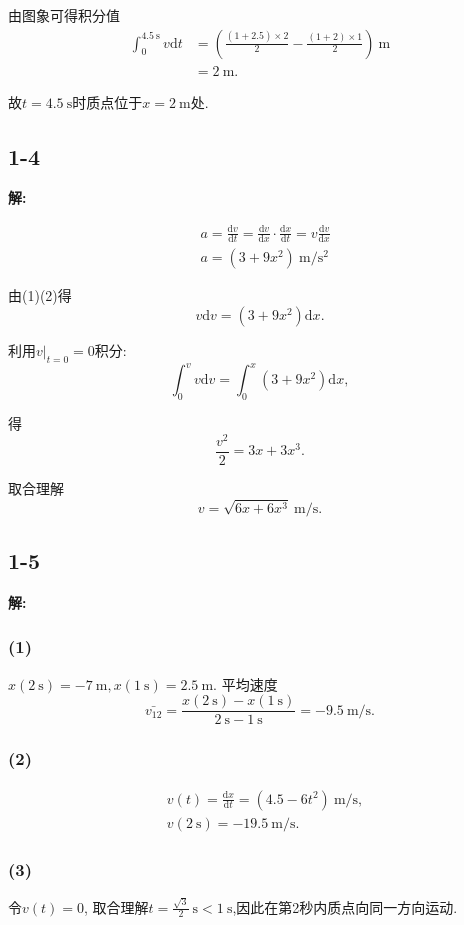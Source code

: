\documentclass[twocolumn]{ctexart}
\begin{document}
由图象可得积分值 
\begin{align*} 
\int_{0}^{4.5\ \mathrm{s}}v\mathrm{d}t&=(\frac{(1+2.5)\times 2}{2}-\frac{(1+2)\times 1}{2})\ \mathrm{m}\\ 
&=2\ \mathrm{m}. 
\end{align*} 

故$t=4.5\ \mathrm{s}$时质点位于$x=2\ \mathrm{m}$处. 

\subsection*{1-4} 
\noindent 
\textbf{解:} 

\begin{align} 
&a=\frac{\mathrm{d}v}{\mathrm{d}t}=\frac{\mathrm{d}v}{\mathrm{d}x}\cdot\frac{\mathrm{d}x}{\mathrm{d}t}=v\frac{\mathrm{d}v}{\mathrm{d}x}\\ 
&a=(3+9x^2)\ \mathrm{m/s^2} 
\end{align} 

由(1)(2)得 
$$v\mathrm{d}v=(3+9x^2)\mathrm{d}x.$$ 

利用$\left.v\right|_{t=0}=0$积分: 
$$\int_{0}^{v}v\mathrm{d}v=\int_{0}^{x}(3+9x^2)\mathrm{d}x,$$ 

得 
$$\frac{v^2}{2}=3x+3x^3.$$ 

取合理解 
$$v=\sqrt{6x+6x^3}\ \mathrm{m/s}.$$ 
\subsection*{1-5} 
\noindent 
\textbf{解:} 

\subsubsection*{(1)} 
$x(2\ \mathrm{s})=-7\ \mathrm{m},x(1\ \mathrm{s})=2.5\ \mathrm{m}.$ 平均速度 
$$\bar{v_{12}}=\frac{x(2\ \mathrm{s})-x(1\ \mathrm{s})}{2\ \mathrm{s}-1\ \mathrm{s}}=-9.5\ \mathrm{m/s}.$$ 
\subsubsection*{(2)} 
\begin{align*} 
&v(t)=\frac{\mathrm{d}x}{\mathrm{d}t}=(4.5-6t^2)\ \mathrm{m/s},\\ 
&v(2\ \mathrm{s})=-19.5\ \mathrm{m/s}. 
\end{align*} 
\subsubsection*{(3)} 
令$v(t)=0$, 取合理解$\displaystyle{t=\frac{\sqrt{3}}{2}\ \mathrm{s}<1\ \mathrm{s}}$,因此在第2秒内质点向同一方向运动. 
\end{document}
